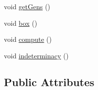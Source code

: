 \begin{DoxyCompactItemize}
\item 
void \hyperlink{structMackey_1_1internal_1_1MasseyCompute_ae7e9d0ea52c8e8373374535d41221dcb}{get\+Gens} ()
\item 
void \hyperlink{structMackey_1_1internal_1_1MasseyCompute_aff177659d2dbcd9c3fe9d644d55141ca}{box} ()
\item 
void \hyperlink{structMackey_1_1internal_1_1MasseyCompute_a0dc26be60def312ab591b72b1e24144f}{compute} ()
\item 
void \hyperlink{structMackey_1_1internal_1_1MasseyCompute_a720436488adcfdf1d976b27be7d95b55}{indeterminacy} ()
\end{DoxyCompactItemize}
\subsection*{Public Attributes}

